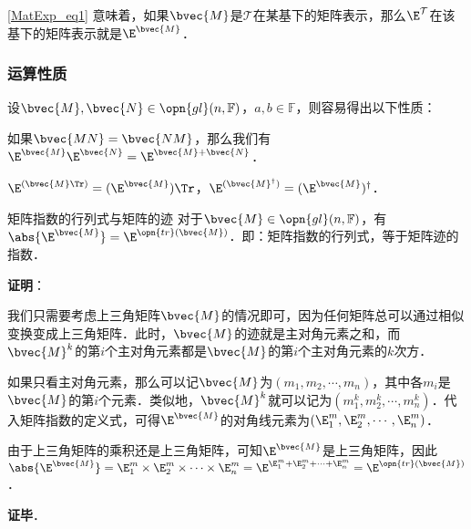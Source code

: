 \autoref{MatExp_eq1} 意味着，如果$\bvec{M}$是$\mathcal{T}$在某基下的矩阵表示，那么$\E^\mathcal{T}$在该基下的矩阵表示就是$\E^\bvec{M}$．

\subsubsection{运算性质}

设$\bvec{M}, \bvec{N}\in \opn{gl}(n, \mathbb{F})$，$a, b\in\mathbb{F}$，则容易得出以下性质：

如果$\bvec{MN}=\bvec{NM}$，那么我们有$\E^{\bvec{M}}\E^{\bvec{N}}=\E^{\bvec{M}+\bvec{N}}$．

$\E^{(\bvec{M}\Tr)}=({\E^\bvec{M}})\Tr$，$\E^{(\bvec{M}^\dagger)}=({\E^\bvec{M}})^\dagger$．

\begin{theorem}{矩阵指数的行列式与矩阵的迹}
对于$\bvec{M}\in\opn{gl}(n, \mathbb{F})$，有$\abs{\E^\bvec{M}}=\E^{\opn{tr}(\bvec{M})}$．即：矩阵指数的行列式，等于矩阵迹的指数．
\end{theorem}

\textbf{证明}：

我们只需要考虑上三角矩阵$\bvec{M}$的情况即可，因为任何矩阵总可以通过相似变换变成上三角矩阵．此时，$\bvec{M}$的迹就是主对角元素之和，而$\bvec{M}^k$的第$i$个主对角元素都是$\bvec{M}$的第$i$个主对角元素的$k$次方．

如果只看主对角元素，那么可以记$\bvec{M}$为$(m_1, m_2,\cdots,m_n)$，其中各$m_i$是$\bvec{M}$的第$i$个元素．类似地，$\bvec{M}^k$就可以记为$(m_1^k, m_2^k,\cdots,m_n^k)$．代入矩阵指数的定义式，可得$\E^{\bvec{M}}$的对角线元素为$(\E^m_1, \E^m_2,\cdots, \E^m_n)$．

由于上三角矩阵的乘积还是上三角矩阵，可知$\E^{\bvec{M}}$是上三角矩阵，因此$\abs{\E^\bvec{M}}=\E^m_1\times\E^m_2\times\cdots\times\E^m_n=\E^{\E^m_1+\E^m_2+\cdots+\E^m_n}=\E^{\opn{tr}(\bvec{M})}$．

\textbf{证毕}．








